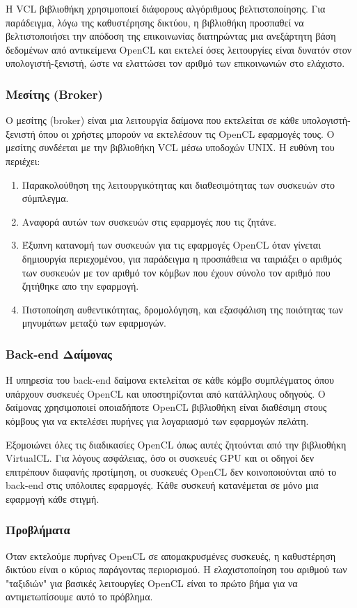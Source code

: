 Η VCL βιβλιοθήκη χρησιμοποιεί διάφορους αλγόριθμους βελτιστοποίησης. Για παράδειγμα, λόγω της καθυστέρησης δικτύου, η βιβλιοθήκη προσπαθεί να βελτιστοποιήσει την απόδοση της επικοινωνίας διατηρώντας μια ανεξάρτητη βάση δεδομένων από αντικείμενα OpenCL και εκτελεί όσες λειτουργίες είναι δυνατόν στον υπολογιστή-ξενιστή, ώστε να ελαττώσει τον αριθμό των επικοινωνιών στο ελάχιστο.\cite{virtualcl-3}
\subsubsection{Μεσίτης (Broker)}
Ο μεσίτης (broker) είναι μια λειτουργία δαίμονα που εκτελείται σε κάθε υπολογιστή-ξενιστή όπου οι χρήστες μπορούν να εκτελέσουν τις OpenCL εφαρμογές τους. Ο μεσίτης συνδέεται με την βιβλιοθήκη VCL μέσω υποδοχών UNIX. Η ευθύνη του περιέχει:
\begin{enumerate}
\item Παρακολούθηση της λειτουργικότητας και διαθεσιμότητας των συσκευών στο σύμπλεγμα.
\item Αναφορά αυτών των συσκευών στις εφαρμογές που τις ζητάνε.
\item Έξυπνη κατανομή των συσκευών για τις εφαρμογές OpenCL όταν γίνεται δημιουργία περιεχομένου, για παράδειγμα η προσπάθεια να ταιριάξει ο αριθμός των συσκευών με τον αριθμό τον κόμβων που έχουν σύνολο τον αριθμό που ζητήθηκε απο την εφαρμογή.
\item Πιστοποίηση αυθεντικότητας, δρομολόγηση, και εξασφάλιση της ποιότητας των μηνυμάτων μεταξύ των εφαρμογών. 
\end{enumerate}

\subsubsection{Back-end Δαίμονας}
Η υπηρεσία του back-end δαίμονα εκτελείται σε κάθε κόμβο συμπλέγματος όπου υπάρχουν συσκευές OpenCL και υποστηρίζονται από κατάλληλους οδηγούς. Ο δαίμονας χρησιμοποιεί οποιαδήποτε OpenCL βιβλιοθήκη είναι διαθέσιμη στους κόμβους για να εκτελέσει πυρήνες για λογαριασμό των εφαρμογών πελάτη.

Εξομοιώνει όλες τις διαδικασίες OpenCL όπως αυτές ζητούνται από την βιβλιοθήκη VirtualCL. Για λόγους ασφάλειας, όσο οι συσκευές GPU και οι οδηγοί δεν επιτρέπουν διαφανής προτίμηση, οι συσκευές OpenCL δεν κοινοποιούνται από το back-end στις υπόλοιπες εφαρμογές. Κάθε συσκευή κατανέμεται σε μόνο μια εφαρμογή κάθε στιγμή.\cite{virtualcl-4}


\subsubsection{Προβλήματα}
Όταν εκτελούμε πυρήνες OpenCL σε απομακρυσμένες συσκευές, η καθυστέρηση δικτύου είναι ο κύριος παράγοντας περιορισμού. Η ελαχιστοποίηση του αριθμού των "ταξιδιών" για βασικές λειτουργίες OpenCL είναι το πρώτο βήμα για να αντιμετωπίσουμε αυτό το πρόβλημα.

